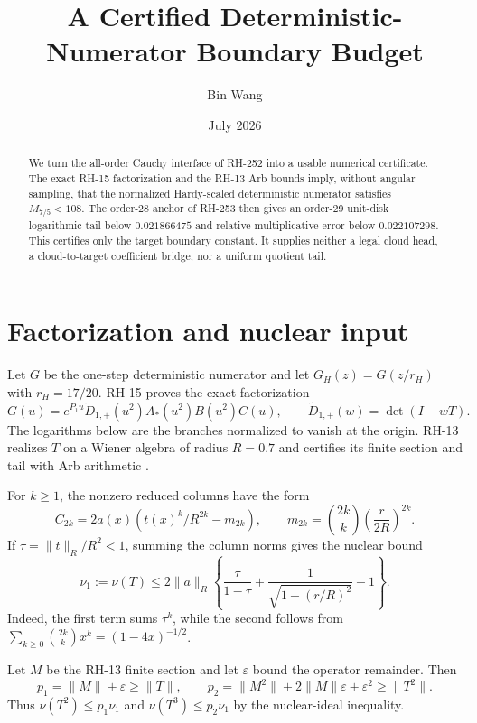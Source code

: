 \documentclass[11pt]{article}
\title{A Certified Deterministic-Numerator Boundary Budget}
\author{Bin Wang}
\date{July 2026}
\theoremstyle{remark}
\begin{document}
\maketitle

\begin{abstract}
We turn the all-order Cauchy interface of RH-252 into a usable numerical
certificate.  The exact RH-15 factorization and the RH-13 Arb bounds imply,
without angular sampling, that the normalized Hardy-scaled deterministic
numerator satisfies $M_{7/5}<108$.  The order-28 anchor of RH-253 then gives
an order-29 unit-disk logarithmic tail below $0.021866475$ and relative
multiplicative error below $0.022107298$.  This certifies only the target
boundary constant.  It supplies neither a legal cloud head, a cloud-to-target
coefficient bridge, nor a uniform quotient tail.
\end{abstract}

\section{Factorization and nuclear input}

Let $G$ be the one-step deterministic numerator and let
$G_H(z)=G(z/r_H)$ with $r_H=17/20$.  RH-15 proves the exact factorization
\citep{WangRH15}
\begin{equation}
 G(u)=e^{P_1u}\widetilde D_{1,+}(u^2)A_*(u^2)B(u^2)C(u),
 \qquad \widetilde D_{1,+}(w)=\det(I-wT).
 \label{eq:factor}
\end{equation}
The logarithms below are the branches normalized to vanish at the origin.
RH-13 realizes $T$ on a Wiener algebra of radius $R=0.7$ and certifies its
finite section and tail with Arb arithmetic \citep{WangRH13}.

For $k\ge1$, the nonzero reduced columns have the form
\[
 C_{2k}=2a(x)\left(t(x)^k/R^{2k}-m_{2k}\right),
 \qquad
 m_{2k}=\binom{2k}{k}\left(\frac{r}{2R}\right)^{2k}.
\]
If $\tau=\|t\|_R/R^2<1$, summing the column norms gives the nuclear bound
\begin{equation}
 \nu_1:=\nu(T)\le2\|a\|_R\left\{
 \frac{\tau}{1-\tau}
 +\frac1{\sqrt{1-(r/R)^2}}-1\right\}.
 \label{eq:nuclear}
\end{equation}
Indeed, the first term sums $\tau^k$, while the second follows from
$\sum_{k\ge0}\binom{2k}{k}x^k=(1-4x)^{-1/2}$.

Let $M$ be the RH-13 finite section and let $\varepsilon$ bound the operator
remainder.  Then
\begin{equation}
 p_1=\|M\|+\varepsilon\ge\|T\|,
 \qquad
 p_2=\|M^2\|+2\|M\|\varepsilon+\varepsilon^2\ge\|T^2\|.
 \label{eq:p12}
\end{equation}
Thus $\nu(T^2)\le p_1\nu_1$ and $\nu(T^3)\le p_2\nu_1$ by the nuclear-ideal
inequality.
\end{document}

